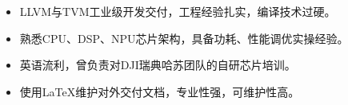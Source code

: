 {\small
      \begin{itemize}[itemsep=0pt]
        \item{LLVM与TVM工业级开发交付，工程经验扎实，编译技术过硬。}
        \item{熟悉CPU、DSP、NPU芯片架构，具备功耗、性能调优实操经验。}
        \item{英语流利，曾负责对DJI瑞典哈苏团队的自研芯片培训。}
        \item{使用\LaTeX 维护对外交付文档，专业性强，可维护性高。}
      \end{itemize}
} 